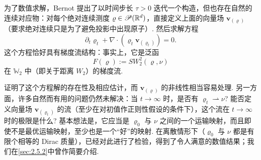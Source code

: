 为了数值求解，Bernot 提出了以时间步长 $\tau>0$ 迭代一个构造，但也存在自然的连续对应物：对每个绝对连续测度 $\varrho\in\mathscr P(\mathbb R^d)$，直接定义上面的向量场 $\mathbf v_{(\varrho)}$（要求绝对连续只是为了避免投影中出现原子）. 然后求解方程
\[
\partial_t\varrho_t+\nabla\cdot(\varrho_t\mathbf v_{(\varrho_t)})=0.
\]
这个方程恰好具有梯度流结构：事实上，它是泛函
\[
F(\varrho):=SW_2^2(\varrho,\nu)
\]
在 $\mathbb W_2$ 中（即关于距离 $W_2$）的梯度流.

\cite{b65}证明了这个方程解的存在性及相应估计，而 $\mathbf v_{(\varrho)}$ 的非线性相当容易处理. 另一方面，许多自然而有用的问题仍然未解决：当 $t\to\infty$ 时，是否有 $\varrho_t\rightharpoonup\nu$? 能否定义向量场 $\mathbf v_{(\varrho_t)}$ 的流（至少在对初值作正则性假设的条件下），这个流在 $t\to\infty$ 时的极限是什么? 基本想法是，它应当是 $\varrho_0$ 与 $\nu$ 之间的一个运输映射，而且即使不是最优运输映射，至少也是一个“好”的映射. 在离散情形下（$\varrho_0$ 与 $\nu$ 都是有限个相等的 Dirac 质量），已经对此进行了检验，得到了令人满意的数值结果；我们在\autoref{sec:2.5.2}中曾作简要介绍.
